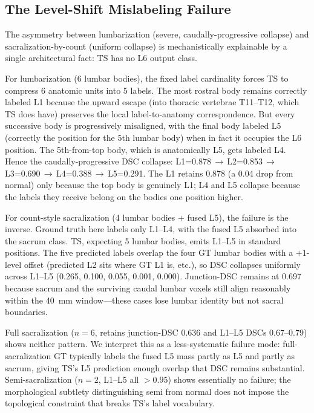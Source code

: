 \documentclass{article}
\begin{document}
\subsection{The Level-Shift Mislabeling Failure}
\label{sec:level_shift}

The asymmetry between lumbarization (severe, caudally-progressive
collapse) and sacralization-by-count (uniform collapse) is
mechanistically explainable by a single architectural fact: TS
has no L6 output class.

For lumbarization (6 lumbar bodies), the fixed label cardinality
forces TS to compress 6 anatomic units into 5 labels.
The most rostral body remains correctly labeled L1 because the
upward escape (into thoracic vertebrae T11--T12, which TS does
have) preserves the local label-to-anatomy correspondence.
But every successive body is progressively misaligned, with the
final body labeled L5 (correctly the position for the 5th lumbar
body) when in fact it occupies the L6 position.
The 5th-from-top body, which is anatomically L5, gets labeled L4.
Hence the caudally-progressive DSC collapse:
L1=0.878\,$\to$\,L2=0.853\,$\to$\,L3=0.690\,$\to$\,L4=0.388\,$\to$\,L5=0.291.
The L1 retains 0.878 (a 0.04 drop from normal) only because the
top body is genuinely L1; L4 and L5 collapse because the labels
they receive belong on the bodies one position higher.

For count-style sacralization (4 lumbar bodies + fused L5),
the failure is the inverse.
Ground truth here labels only L1--L4, with the fused L5 absorbed
into the sacrum class.
TS, expecting 5 lumbar bodies, emits L1--L5 in standard positions.
The five predicted labels overlap the four GT lumbar bodies with a
$+1$-level offset (predicted L2 sits where GT L1 is, etc.), so
DSC collapses uniformly across L1--L5
(0.265, 0.100, 0.055, 0.001, 0.000).
Junction-DSC remains at 0.697 because sacrum and the surviving
caudal lumbar voxels still align reasonably within the 40~mm
window---these cases lose lumbar identity but not sacral
boundaries.

Full sacralization ($n=6$, retains junction-DSC 0.636 and L1--L5
DSCs 0.67--0.79) shows neither pattern.
We interpret this as a less-systematic failure mode:
full-sacralization GT typically labels the fused L5 mass partly
as L5 and partly as sacrum, giving TS's L5 prediction enough
overlap that DSC remains substantial.
Semi-sacralization ($n=2$, L1--L5 all $>0.95$) shows essentially
no failure; the morphological subtlety distinguishing semi from
normal does not impose the topological constraint that breaks
TS's label vocabulary.
\end{document}
